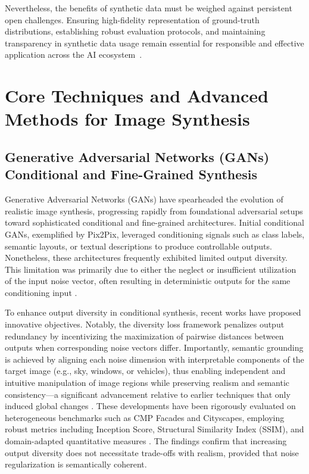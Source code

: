 \documentclass[sigconf]{acmart}
\begin{document}
Nevertheless, the benefits of synthetic data must be weighed against persistent open challenges. Ensuring high-fidelity representation of ground-truth distributions, establishing robust evaluation protocols, and maintaining transparency in synthetic data usage remain essential for responsible and effective application across the AI ecosystem~\cite{ref13,ref62,ref63,ref87,ref88}.

\section{Core Techniques and Advanced Methods for Image Synthesis}

\subsection{Generative Adversarial Networks (GANs) Conditional and Fine-Grained Synthesis}

Generative Adversarial Networks (GANs) have spearheaded the evolution of realistic image synthesis, progressing rapidly from foundational adversarial setups toward sophisticated conditional and fine-grained architectures. Initial conditional GANs, exemplified by Pix2Pix, leveraged conditioning signals such as class labels, semantic layouts, or textual descriptions to produce controllable outputs. Nonetheless, these architectures frequently exhibited limited output diversity. This limitation was primarily due to either the neglect or insufficient utilization of the input noise vector, often resulting in deterministic outputs for the same conditioning input \cite{ref93,ref95}.

To enhance output diversity in conditional synthesis, recent works have proposed innovative objectives. Notably, the diversity loss framework penalizes output redundancy by incentivizing the maximization of pairwise distances between outputs when corresponding noise vectors differ. Importantly, semantic grounding is achieved by aligning each noise dimension with interpretable components of the target image (e.g., sky, windows, or vehicles), thus enabling independent and intuitive manipulation of image regions while preserving realism and semantic consistency---a significant advancement relative to earlier techniques that only induced global changes \cite{ref93}. These developments have been rigorously evaluated on heterogeneous benchmarks such as CMP Facades and Cityscapes, employing robust metrics including Inception Score, Structural Similarity Index (SSIM), and domain-adapted quantitative measures \cite{ref93,ref95}. The findings confirm that increasing output diversity does not necessitate trade-offs with realism, provided that noise regularization is semantically coherent.
\end{document}

